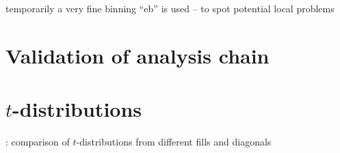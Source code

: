 \> temporarily a very fine binning ``eb'' is used -- to spot potential local problems



\chapter[validation]{Validation of analysis chain}

\iffalse

\> method
\>> simulate data in the same format (distilled ntuple) as the LHC data
\>> run exactly the same analysis chain as for the LHC data
\>> compare MC truth with analysis results

\> MC simulation (program ``simulate\_distill``)
\>> inverse-CDF generation of $t$ according to a data fit including both hadronic and Coulomb components
\>> simulated: vertex smearing, beam divergence, proton transport (linear), RP resolution
\>> time-dependence of vertex RMS: linear from $530$ to $630\un{\mu m}$
\>> simulated 3-out-of-4 and 2-out-of-4 inefficiency, $\th^*_y$ dependent
\>>> according to the fit copied from the 4-RP analysis (the same as used in the analysis)

\> analysis
\>> the same configuration as for the LHC data (``parameters\_global.h``, the same cuts)
\>> time-dependent resolution curves determined from the simulated sample (by program ``resolution\_fit``)
\>> normalisation determined as for LHC data (by program ``normalisation/normalisation``)

\> results
\>> \plot{chain_validation/resolutions_vs_time.pdf} : resolution as function of time
\>>> as expected: linear dependence, very small effect for $\th_y^*$ (almost parallel-to-point focusing)
\>> \plot{chain_validation/t_dist_cmp_truth.pdf} : comparison of $t$-distributions, MC truth vs.\ reconstructed
\>>> perfect agreement

\fi



\chapter[t-distributions]{$t$-distributions}

\>  : comparison of $t$-distributions from different fills and diagonals

